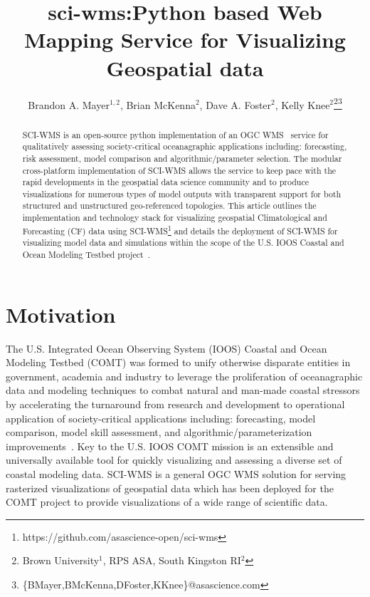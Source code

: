 \documentclass[11pt,twocolumn,twoside]{IEEEtran}
\newcommand{\comt}{COMT}
\newcommand{\ioos}{IOOS}
\newcommand{\ogc}{OGC}
\newcommand{\wms}{WMS}
\newcommand{\sciwms}{SCI-WMS}
\begin{document}
\title{\vspace{0.2in}\sc sci-wms:Python based Web Mapping Service for Visualizing Geospatial data}


\author{Brandon A. Mayer$^{1,2}$, Brian McKenna$^{2}$, Dave A. Foster$^{2}$, Kelly Knee$^{2}$\thanks{Brown University$^{1}$, RPS ASA, South Kingston RI$^{2}$}\thanks{\{BMayer,BMcKenna,DFoster,KKnee\}@asascience.com}}

\maketitle
\thispagestyle{fancy}

\begin{abstract}
\sciwms{} is an open-source python implementation of an \ogc{}
\wms{}~\cite{wms14} service for qualitatively assessing
society-critical oceanagraphic applications including: forecasting,
risk assessment, model comparison and algorithmic/parameter
selection. The modular cross-platform implementation of \sciwms{}
allows the service to keep pace with the rapid developments in the
geospatial data science community and to produce visualizations for
numerous types of model outputs with transparent support for both
structured and unstructured geo-referenced topologies. This article
outlines the implementation and technology stack for visualizing
geospatial Climatological and Forecasting (CF) data using
\sciwms{}\footnote{https://github.com/asascience-open/sci-wms} and
details the deployment of \sciwms{} for visualizing model data and
simulations within the scope of the U.S. \ioos{} Coastal and Ocean
Modeling Testbed project~\cite{luettich13}.
\end{abstract}

\section{Motivation}
The U.S. Integrated Ocean Observing System (\ioos{}) Coastal and Ocean
Modeling Testbed (\comt{}) was formed to unify otherwise disparate
entities in government, academia and industry to leverage the
proliferation of oceanagraphic data and modeling techniques to combat
natural and man-made coastal stressors by accelerating the turnaround
from research and development to operational application of
society-critical applications including: forecasting, model
comparison, model skill assessment, and algorithmic/parameterization
improvements~\cite{luettich13}. Key to the U.S. \ioos{} \comt{}
mission is an extensible and universally available tool for quickly
visualizing and assessing a diverse set of coastal modeling
data. \sciwms{} is a general \ogc{} \wms{} solution for serving
rasterized visualizations of geospatial data which has been deployed
for the \comt{} project to provide visualizations of a wide range of
scientific data.
\end{document}
